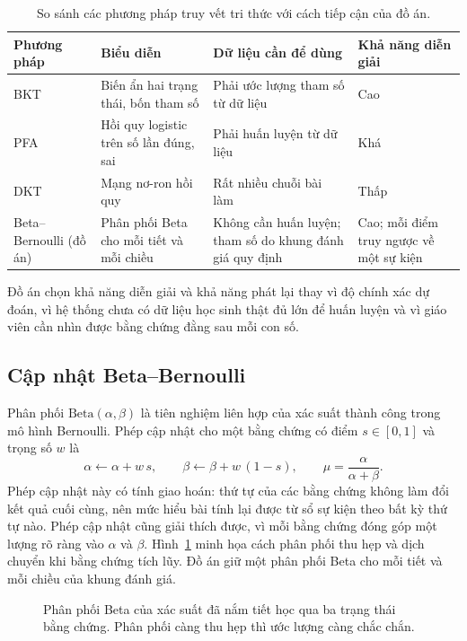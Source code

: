 \begin{table}[ht]
\centering
\caption{So sánh các phương pháp truy vết tri thức với cách tiếp cận của đồ án.}
\label{tab:kt}
\small
\begin{tabularx}{\linewidth}{@{}p{2.6cm}XXX@{}}
\toprule
Phương pháp & Biểu diễn & Dữ liệu cần để dùng & Khả năng diễn giải \\
\midrule
BKT & Biến ẩn hai trạng thái, bốn tham số & Phải ước lượng tham số từ dữ liệu & Cao \\
PFA & Hồi quy logistic trên số lần đúng, sai & Phải huấn luyện từ dữ liệu & Khá \\
DKT & Mạng nơ-ron hồi quy & Rất nhiều chuỗi bài làm & Thấp \\
Beta--Bernoulli (đồ án) & Phân phối Beta cho mỗi tiết và mỗi chiều & Không cần huấn luyện; tham số do khung đánh giá quy định & Cao; mỗi điểm truy ngược về một sự kiện \\
\bottomrule
\end{tabularx}
\end{table}

Đồ án chọn khả năng diễn giải và khả năng phát lại thay vì độ chính xác dự đoán, vì hệ thống chưa có dữ liệu học sinh thật đủ lớn để huấn luyện và vì giáo viên cần nhìn được bằng chứng đằng sau mỗi con số.

\subsection{Cập nhật Beta--Bernoulli}\label{sec:beta-ref}
Phân phối $\mathrm{Beta}(\alpha,\beta)$ là tiên nghiệm liên hợp của xác suất thành công trong mô hình Bernoulli. Phép cập nhật cho một bằng chứng có điểm $s\in[0,1]$ và trọng số $w$ là
\begin{equation}
\alpha\leftarrow\alpha+w\,s,\qquad \beta\leftarrow\beta+w\,(1-s),\qquad \mu=\frac{\alpha}{\alpha+\beta}.
\label{eq:beta}
\end{equation}
Phép cập nhật này có tính giao hoán: thứ tự của các bằng chứng không làm đổi kết quả cuối cùng, nên mức hiểu bài tính lại được từ sổ sự kiện theo bất kỳ thứ tự nào. Phép cập nhật cũng giải thích được, vì mỗi bằng chứng đóng góp một lượng rõ ràng vào $\alpha$ và $\beta$. Hình~\ref{fig:beta} minh họa cách phân phối thu hẹp và dịch chuyển khi bằng chứng tích lũy. Đồ án giữ một phân phối Beta cho mỗi tiết và mỗi chiều của khung đánh giá.

\begin{figure}[ht]
\centering

\caption{Phân phối Beta của xác suất đã nắm tiết học qua ba trạng thái bằng chứng. Phân phối càng thu hẹp thì ước lượng càng chắc chắn.}
\label{fig:beta}
\end{figure}

